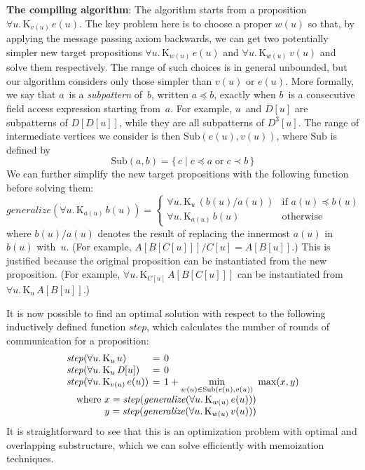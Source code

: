 \documentclass{sokendai_thesis} %
\newcommand{\knows}[2]{\mathrm K_{#1}\,{#2}}
\begin{document}
\textbf{The compiling algorithm}:
The algorithm starts from a proposition $\forall u.\,\knows{v(u)}{e(u)}$.
The key problem here is to choose a proper $w(u)$ so that, by applying the message passing axiom backwards, we can get two potentially simpler new target propositions $\forall u.\,\knows{w(u)}{e(u)}$ and $\forall u.\,\knows{w(u)}{v(u)}$ and solve them respectively.
The range of such choices is in general unbounded, but our algorithm considers only those simpler than $v(u)$ or $e(u)$.
More formally, we say that $a$~is a \emph{subpattern} of~$b$, written $a \preceq b$, exactly when $b$~is a consecutive field access expression starting from~$a$.
For example, $u$~and $D[u]$ are subpatterns of $D[D[u]]$, while they are all subpatterns of $D^3[u]$.
The range of intermediate vertices we consider is then $\mathrm{Sub}(e(u), v(u))$, where $\mathrm{Sub}$ is defined by
\[ \mathrm{Sub}(a, b) = \{\,c \mid c \preceq a \mathrel\text{or} c \prec b \,\} \]
We can further simplify the new target propositions with the following function before solving them:
\[
\mathit{generalize}(\forall u.\,\knows{a(u)}{b(u)}) =
\begin{cases}
\forall u.\,\knows{u}{(b(u)/a(u))} & \text{if~} a(u) \preceq b(u) \\
\forall u.\,\knows{a(u)}{b(u)} & \text{otherwise}
\end{cases}
\]
where $b(u)/a(u)$ denotes the result of replacing the innermost $a(u)$ in $b(u)$ with~$u$.
(For example, $A[B[C[u]]]/C[u] = A[B[u]]$.)
This is justified because the original proposition can be instantiated from the new proposition.
(For example, $\forall u.\,\knows{C[u]}{A[B[C[u]]]}$ can be instantiated from $\forall u.\,\knows{u}{A[B[u]]}$.)

It is now possible to find an optimal solution with respect to the following inductively defined function $\mathit{step}$, which calculates the number of rounds of communication for a proposition:
\[ \setlength{\arraycolsep}{.2em}
\begin{array}{lcl}
\mathit{step}(\forall u.\,\knows{u}{u}) &=& 0 \\
\mathit{step}(\forall u.\,\knows{u}{\mathit{D}[u]}) &=& 0 \\
\mathit{step}(\forall u.\,\knows{v(u)}{e(u)}) &=& \displaystyle 1+ \min_{w(u)\in \mathrm{Sub}(e(u),v(u))}~\max(x, y) \\
\multicolumn{3}{l}{\quad\text{where}~x = \mathit{step}(\mathit{generalize}(\forall u.\,\knows{w(u)}{e(u)}))} \\
\multicolumn{3}{l}{\quad\phantom{\text{where}}~y = \mathit{step}(\mathit{generalize}(\forall u.\,\knows{w(u)}{v(u)}))}
\end{array} \]
It is straightforward to see that this is an optimization problem with optimal and overlapping substructure, which we can solve efficiently with memoization techniques.
\end{document}

